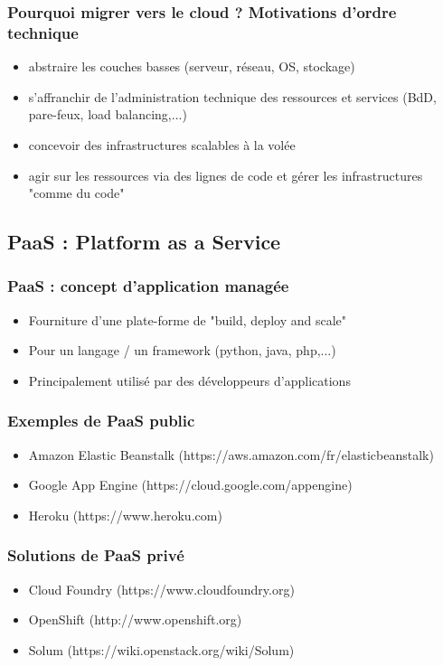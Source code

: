   \begin{frame}
    \frametitle{Pourquoi migrer vers le cloud ? Motivations d'ordre technique}
    \begin{itemize}
      \item abstraire les couches basses (serveur, réseau, OS, stockage)
      \pause
      \item s'affranchir de l'administration technique des ressources et services (BdD, pare-feux, load balancing,...)
      \pause
      \item concevoir des infrastructures scalables à la volée
      \pause
      \item agir sur les ressources via des lignes de code et gérer les infrastructures "comme du code"
    \end{itemize}
  \end{frame}

  \subsection[PaaS]{PaaS : Platform as a Service}

  \begin{frame}
    \frametitle{PaaS : concept d'application managée}
    \begin{itemize}
      \item Fourniture d'une plate-forme de "build, deploy and scale"
      \pause
      \item Pour un langage / un framework (python, java, php,...)
      \pause
      \item Principalement utilisé par des développeurs d'applications
    \end{itemize}
  \end{frame}

  \begin{frame}
    \frametitle{Exemples de PaaS public}
    \begin{itemize}
      \item Amazon Elastic Beanstalk (https://aws.amazon.com/fr/elasticbeanstalk)
      \pause
      \item Google App Engine (https://cloud.google.com/appengine)
      \pause
      \item Heroku (https://www.heroku.com)
    \end{itemize}
  \end{frame}

  \begin{frame}
    \frametitle{Solutions de PaaS privé}
    \begin{itemize}
      \item Cloud Foundry (https://www.cloudfoundry.org)
      \pause
      \item OpenShift (http://www.openshift.org)
      \pause
      \item \alert<5->{Solum} (https://wiki.openstack.org/wiki/Solum)
    \end{itemize}
  \end{frame}

